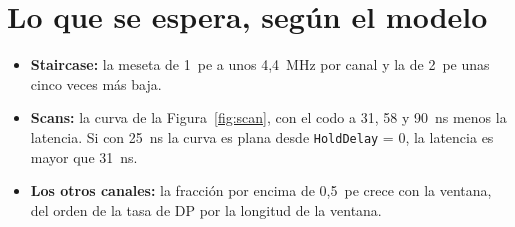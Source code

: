 \documentclass[11pt,a4paper]{article}
\begin{document}
\section{Lo que se espera, según el modelo}

\begin{itemize}
\item {\bf Staircase:} la meseta de 1~pe a unos 4,4~MHz por canal y la de
  2~pe unas cinco veces más baja.
\item {\bf Scans:} la curva de la Figura~\ref{fig:scan}, con el codo a 31,
  58 y 90~ns menos la latencia. Si con 25~ns la curva es plana desde
  \texttt{HoldDelay} = 0, la latencia es mayor que 31~ns.
\item {\bf Los otros canales:} la fracción por encima de 0,5~pe crece con
  la ventana, del orden de la tasa de DP por la longitud de la ventana.
\end{itemize}
\end{document}

